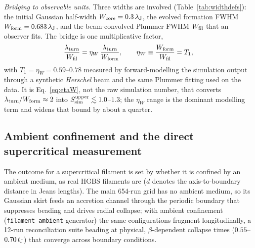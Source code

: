 \documentclass[usenatbib,twoside,twocolumn]{mnras}
\begin{document}
\emph{Bridging to observable units.} Three widths are involved (Table~\ref{tab:widthdefs}): the initial Gaussian half-width $W_{\rm core}=0.3\,\lambda_{\rm J}$, the evolved formation FWHM $W_{\rm form}=0.683\,\lambda_{\rm J}$, and the beam-convolved Plummer FWHM $W_{\rm fil}$ that an observer fits. The bridge is one multiplicative factor,
\begin{equation}
\frac{\lambda_{\rm turn}}{W_{\rm fil}}=\eta_W\,\frac{\lambda_{\rm turn}}{W_{\rm form}},
\qquad \eta_W\equiv\frac{W_{\rm form}}{W_{\rm fil}}=T_1,
\label{eq:etaW}
\end{equation}
with $T_1=\eta_W=0.59$--$0.78$ measured by forward-modelling the simulation output through a synthetic \textit{Herschel} beam and the same Plummer fitting used on the data. It is Eq.~\ref{eq:etaW}, not the raw simulation number, that converts $\lambda_{\rm turn}/W_{\rm form}\approx2$ into $S_{\rm sim}^{\rm upper}\lesssim1.0$--$1.3$; the $\eta_W$ range is the dominant modelling term and widens that bound by about a quarter.



\subsection{Ambient confinement and the direct supercritical measurement}
\label{sec:modecompetition}

The outcome for a supercritical filament is set by whether it is confined by an ambient medium, as real HGBS filaments are ($d$ denotes the axis-to-boundary distance in Jeans lengths). The main 654-run grid has no ambient medium, so its Gaussian skirt feeds an accretion channel through the periodic boundary that suppresses beading and drives radial collapse; with ambient confinement (\texttt{filament\_ambient} generator) the same configurations fragment longitudinally, a 12-run reconciliation suite beading at physical, $\beta$-dependent collapse times ($0.55$--$0.70\,t_{\rm J}$) that converge across boundary conditions.
\end{document}
